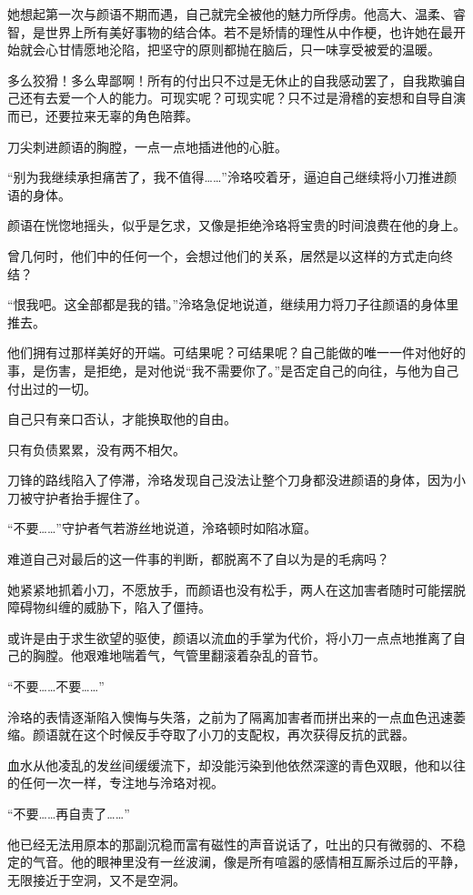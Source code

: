\documentclass[UTF8, scheme = chinese, openany]{ctexbook}
\begin{document}
她想起第一次与颜语不期而遇，自己就完全被他的魅力所俘虏。他高大、温柔、睿智，是世界上所有美好事物的结合体。若不是矫情的理性从中作梗，也许她在最开始就会心甘情愿地沦陷，把坚守的原则都抛在脑后，只一味享受被爱的温暖。

多么狡猾！多么卑鄙啊！所有的付出只不过是无休止的自我感动罢了，自我欺骗自己还有去爱一个人的能力。可现实呢？可现实呢？只不过是滑稽的妄想和自导自演而已，还要拉来无辜的角色陪葬。

刀尖刺进颜语的胸膛，一点一点地插进他的心脏。

“别为我继续承担痛苦了，我不值得……”泠珞咬着牙，逼迫自己继续将小刀推进颜语的身体。

颜语在恍惚地摇头，似乎是乞求，又像是拒绝泠珞将宝贵的时间浪费在他的身上。

曾几何时，他们中的任何一个，会想过他们的关系，居然是以这样的方式走向终结？

“恨我吧。这全部都是我的错。”泠珞急促地说道，继续用力将刀子往颜语的身体里推去。

他们拥有过那样美好的开端。可结果呢？可结果呢？自己能做的唯一一件对他好的事，是伤害，是拒绝，是对他说“我不需要你了。”是否定自己的向往，与他为自己付出过的一切。

自己只有亲口否认，才能换取他的自由。

只有负债累累，没有两不相欠。

刀锋的路线陷入了停滞，泠珞发现自己没法让整个刀身都没进颜语的身体，因为小刀被守护者抬手握住了。

“不要……”守护者气若游丝地说道，泠珞顿时如陷冰窟。

难道自己对最后的这一件事的判断，都脱离不了自以为是的毛病吗？

她紧紧地抓着小刀，不愿放手，而颜语也没有松手，两人在这加害者随时可能摆脱障碍物纠缠的威胁下，陷入了僵持。

或许是由于求生欲望的驱使，颜语以流血的手掌为代价，将小刀一点点地推离了自己的胸膛。他艰难地喘着气，气管里翻滚着杂乱的音节。

“不要……不要……”

泠珞的表情逐渐陷入懊悔与失落，之前为了隔离加害者而拼出来的一点血色迅速萎缩。颜语就在这个时候反手夺取了小刀的支配权，再次获得反抗的武器。

血水从他凌乱的发丝间缓缓流下，却没能污染到他依然深邃的青色双眼，他和以往的任何一次一样，专注地与泠珞对视。

“不要……再自责了……”

他已经无法用原本的那副沉稳而富有磁性的声音说话了，吐出的只有微弱的、不稳定的气音。他的眼神里没有一丝波澜，像是所有喧嚣的感情相互厮杀过后的平静，无限接近于空洞，又不是空洞。
\end{document}
